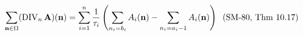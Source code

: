 \documentclass[preview]{standalone}
\begin{document}
\begin{align*}
\special{dvisvgm:raw <g id='unique000'>}\sum_{\mathbf{n}\in\Omega}(\operatorname{DIV}_n\mathbf{A})(\mathbf{n}) = \sum_{i=1}^n \frac{1}{\tau_i}\left(\sum_{n_i=b_i} A_i(\mathbf{n}) - \sum_{n_i=a_i-1} A_i(\mathbf{n})\right)\;\;(\text{SM-80, Thm 10.17})\special{dvisvgm:raw </g>}
\end{align*}
\end{document}
